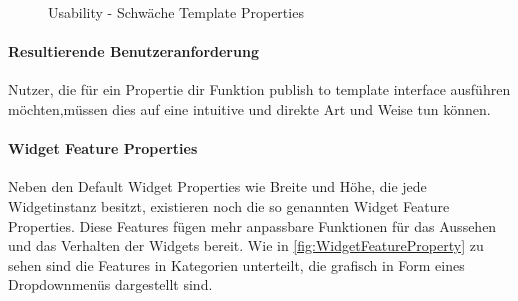 \begin{figure}%
  \centering
  \qquad
  \caption{Usability - Schwäche Template Properties}%
  \label{fig:TemplateProperties}
\end{figure}


\paragraph{Resultierende Benutzeranforderung}
Nutzer, die für ein Propertie dir Funktion publish to template interface ausführen möchten,müssen dies auf eine intuitive und direkte Art und Weise tun können.

\paragraph{Widget Feature Properties}

Neben den Default Widget Properties wie Breite und Höhe, die jede Widgetinstanz besitzt, existieren noch die so genannten Widget Feature Properties.
Diese Features fügen mehr anpassbare Funktionen für das Aussehen und das Verhalten der Widgets bereit.
Wie in \cref{fig:WidgetFeatureProperty} zu sehen sind die Features in Kategorien unterteilt, die grafisch in Form eines Dropdownmenüs dargestellt sind.

